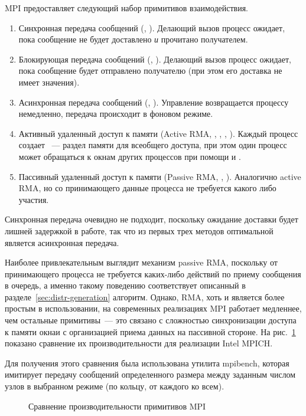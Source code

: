 MPI предоставляет следующий набор примитивов взаимодействия.

\begin{enumerate}
\item Синхронная передача сообщений (, ). Делающий вызов процесс
  ожидает, пока сообщение не будет доставлено \emph{и} прочитано получателем.
\item Блокирующая передача сообщений (, ). Делающий вызов процесс
  ожидает, пока сообщение будет отправлено получателю (при этом его доставка не
  имеет значения).
\item Асинхронная передача сообщений (, ). Управление возвращается
  процессу немедленно, передача происходит в фоновом режиме.
\item Активный удаленный доступ к памяти (Active RMA, ,
  , , ). Каждый процесс создает
  ~--- раздел памяти для всеобщего доступа, при этом один процесс может
  обращаться к окнам других процессов при помощи  и .
\item Пассивный удаленный доступ к памяти (Passive RMA, ,
  ). Аналогично active RMA, но со принимающего данные процесса не
  требуется какого либо участия.
\end{enumerate}

Синхронная передача очевидно не подходит, поскольку ожидание доставки будет лишней
задержкой в работе, так что из первых трех методов оптимальной является асинхронная
передача.

Наиболее привлекательным выглядит механизм passive RMA, поскольку от принимающего процесса
не требуется каких-либо действий по приему сообщения в очередь, а именно такому поведению
соответствует описанный в разделе~\ref{sec:distr-generation} алгоритм. Однако, RMA, хоть и
является более простым в использовании, на современных реализациях MPI работает медленнее,
чем остальные примитивы~--- это связано с сложностью синхронизации доступа к памяти окнаи
с организацией приема данных на пассивной стороне. На рис.~\ref{fig:mpi-primitives}
показано сравнение их производительности для реализации Intel MPICH.

Для получения этого сравнения была использована утилита mpibench, которая имитирует
передачу сообщений определенного размера между заданным числом узлов в выбранном режиме
(по кольцу, от каждого ко всем\etc).

\begin{figure}[ht]
  \centering
  \caption{Сравнение производительности примитивов MPI}
  \label{fig:mpi-primitives}
\end{figure}

